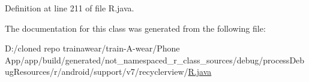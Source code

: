 Definition at line 211 of file R.\+java.



The documentation for this class was generated from the following file\+:\begin{DoxyCompactItemize}
\item 
D\+:/cloned repo trainawear/train-\/\+A-\/wear/\+Phone App/app/build/generated/not\+\_\+namespaced\+\_\+r\+\_\+class\+\_\+sources/debug/process\+Debug\+Resources/r/android/support/v7/recyclerview/\mbox{\hyperlink{process_debug_resources_2r_2android_2support_2v7_2recyclerview_2_r_8java}{R.\+java}}\end{DoxyCompactItemize}
